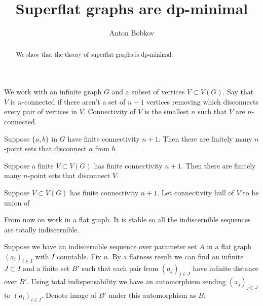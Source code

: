 \documentclass{amsart}
\begin{document}
\title{Superflat graphs are dp-minimal}
\author{Anton Bobkov}

\begin{abstract}
	We show that the theory of superflat graphs is dp-minimal.
\end{abstract}

\maketitle

We work with an infinite graph $G$ and a subset of vertices $V \subset V(G)$. Say that $V$ is $n$-connected if there aren't a set of $n-1$ vertices removing which disconnects every pair of vertices in $V$. Connectivity of $V$ is the smallest $n$ such that $V$ are $n$-connected.

\begin{Lemma}
	Suppose $\{a,b\}$ in $G$ have finite connectivity $n+1$. Then there are finitely many $n$-point sets that disconnect $a$ from $b$.
\end{Lemma}

\begin{Corollary}
	Suppose a finite $V \subset V(G)$ has finite connectivity $n+1$. Then there are finitely many $n$-point sets that disconnect $V$.
\end{Corollary}

\begin{Definition}
	Suppose $V \subset V(G)$ has finite connectivity $n+1$. Let connectivity hull of $V$ to be union of 
\end{Definition}

From now on work in a flat graph. It is stable so all the indiscernible sequences are totally indiscernible.

Suppose we have an indiscernible sequence over parameter set $A$ in a flat graph $(a_i)_{i \in I}$ with $I$ countable. Fix $n$. By a flatness result we can find an infinite $J \subset I$ and a finite set $B'$ such that each pair from $(a_j)_{j \in J}$ have infinite distance over $B'$. Using total indispensability we have an automorphism sending $(a_j)_{j \in J}$ to $(a_i)_{i \in I}$. Denote image of $B'$ under this automorphism as $B$. 
\end{document}
